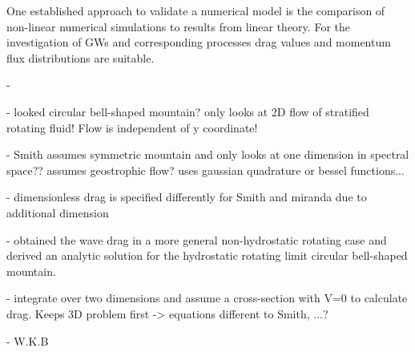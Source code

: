 


One established approach to validate a numerical model is the comparison of non-linear numerical simulations to results from linear theory. For the investigation of GWs and corresponding processes drag values and momentum flux distributions are suitable.


- \textcite{bretherton_momentum_1969}

- \textcite{smith_influence_1979} looked circular bell-shaped mountain? only looks at 2D flow of stratified rotating fluid! Flow is independent of y coordinate! 

- Smith assumes symmetric mountain and only looks at one dimension in spectral space?? assumes geostrophic flow? uses gaussian quadrature or bessel functions...

- dimensionless drag is specified differently for Smith and miranda due to additional dimension

- \textcite{miranda_non-linear_1992} obtained the wave drag in a more general non-hydrostatic rotating case and derived an analytic solution for the hydrostatic rotating limit circular bell-shaped mountain. 

- integrate over two dimensions and assume a cross-section with V=0 to calculate drag. Keeps 3D problem first -> equations different to Smith, ...?

- W.K.B


